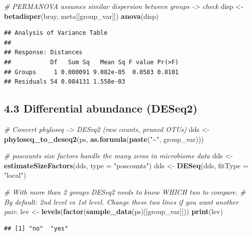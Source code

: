 \documentclass[
]{article}
\newenvironment{Shaded}{\begin{snugshade}}{\end{snugshade}}
\newcommand{\AttributeTok}[1]{\textcolor[rgb]{0.13,0.29,0.53}{#1}}
\newcommand{\CommentTok}[1]{\textcolor[rgb]{0.56,0.35,0.01}{\textit{#1}}}
\newcommand{\FunctionTok}[1]{\textcolor[rgb]{0.13,0.29,0.53}{\textbf{#1}}}
\newcommand{\NormalTok}[1]{#1}
\newcommand{\OtherTok}[1]{\textcolor[rgb]{0.56,0.35,0.01}{#1}}
\newcommand{\StringTok}[1]{\textcolor[rgb]{0.31,0.60,0.02}{#1}}
\begin{document}
\begin{Shaded}
\begin{Highlighting}[]
\CommentTok{\# PERMANOVA assumes similar dispersion between groups {-}\textgreater{} check}
\NormalTok{disp }\OtherTok{\textless{}{-}} \FunctionTok{betadisper}\NormalTok{(bray, meta[[group\_var]])}
\FunctionTok{anova}\NormalTok{(disp)}
\end{Highlighting}
\end{Shaded}

\begin{verbatim}
## Analysis of Variance Table
## 
## Response: Distances
##           Df   Sum Sq   Mean Sq F value Pr(>F)
## Groups     1 0.000091 9.082e-05  0.0583 0.8101
## Residuals 54 0.084131 1.558e-03
\end{verbatim}

\subsection{4.3 Differential abundance
(DESeq2)}\label{differential-abundance-deseq2}

\begin{Shaded}
\begin{Highlighting}[]
\CommentTok{\# Convert phyloseq {-}\textgreater{} DESeq2 (raw counts, pruned OTUs)}
\NormalTok{dds }\OtherTok{\textless{}{-}} \FunctionTok{phyloseq\_to\_deseq2}\NormalTok{(ps, }\FunctionTok{as.formula}\NormalTok{(}\FunctionTok{paste}\NormalTok{(}\StringTok{"\textasciitilde{}"}\NormalTok{, group\_var)))}

\CommentTok{\# \textquotesingle{}poscounts\textquotesingle{} size factors handle the many zeros in microbiome data}
\NormalTok{dds }\OtherTok{\textless{}{-}} \FunctionTok{estimateSizeFactors}\NormalTok{(dds, }\AttributeTok{type =} \StringTok{"poscounts"}\NormalTok{)}
\NormalTok{dds }\OtherTok{\textless{}{-}} \FunctionTok{DESeq}\NormalTok{(dds, }\AttributeTok{fitType =} \StringTok{"local"}\NormalTok{)}

\CommentTok{\# With more than 2 groups DESeq2 needs to know WHICH two to compare.}
\CommentTok{\# By default: 2nd level vs 1st level. Change these two lines if you want another pair.}
\NormalTok{lev }\OtherTok{\textless{}{-}} \FunctionTok{levels}\NormalTok{(}\FunctionTok{factor}\NormalTok{(}\FunctionTok{sample\_data}\NormalTok{(ps)[[group\_var]]))}
\FunctionTok{print}\NormalTok{(lev)}
\end{Highlighting}
\end{Shaded}

\begin{verbatim}
## [1] "no"  "yes"
\end{verbatim}
\end{document}
